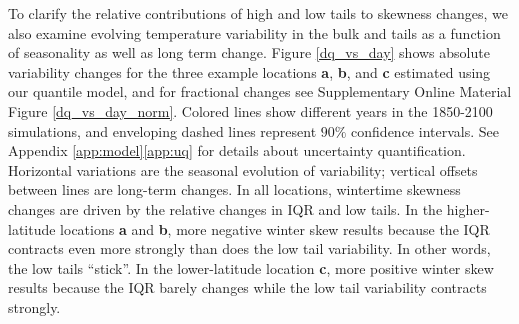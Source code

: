 \documentclass{ametsoc}
\begin{document}
To clarify the relative contributions of high and low tails to skewness changes, we 
also examine evolving temperature variability in the bulk and tails as a function of seasonality as well as long term change. 
Figure \ref{dq_vs_day} shows absolute variability changes 
for the three example locations \textbf{a}, \textbf{b}, and \textbf{c}
estimated using our quantile model, and for fractional changes see Supplementary Online Material Figure \ref{dq_vs_day_norm}.  %
Colored lines show different years in the 1850-2100 simulations, and enveloping dashed lines represent $90\%$ confidence intervals. See Appendix \ref{app:model}\ref{app:uq} for details about uncertainty quantification.
Horizontal variations are the seasonal evolution of variability; vertical offsets between lines are long-term changes.
In all locations, wintertime skewness changes are driven by the relative changes in IQR and low tails. In the higher-latitude locations \textbf{a} and \textbf{b}, more negative winter skew results because the IQR contracts even more strongly than does the low tail variability. In other words, the low tails ``stick''.  In the lower-latitude location \textbf{c}, more positive winter skew results because the IQR barely changes while the low tail variability contracts strongly. 


%

\end{document}
